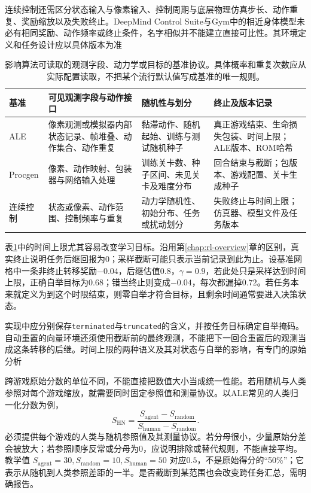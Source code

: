 连续控制还需区分状态输入与像素输入、控制周期与底层物理仿真步长、动作重复、奖励缩放以及失败终止。DeepMind Control Suite与Gym中的相近身体模型未必有相同奖励、动作频率或终止条件，名字相似并不能建立直接可比性。其环境定义和任务设计应以具体版本为准

\begin{table}[t]
  \centering
  \small
  \begin{tabularx}{\linewidth}{>{\raggedright\arraybackslash}p{21mm} >{\raggedright\arraybackslash}X >{\raggedright\arraybackslash}X >{\raggedright\arraybackslash}X}
    \toprule
    基准 & 可见观测字段与动作接口 & 随机性与划分 & 终止及版本记录 \\
    \midrule
    ALE & 像素观测或模拟器内部状态记录、帧堆叠、动作集合、动作重复 & 黏滞动作、随机起始、训练与测试随机种子 & 真正游戏结束、生命损失包装、时间上限；ALE版本、ROM哈希 \\
    Procgen & 像素、动作映射、包装器与网络输入处理 & 训练关卡数、种子区间、未见关卡及难度分布 & 回合结束与截断；包版本、游戏配置、关卡生成种子 \\
    连续控制 & 状态或像素、动作范围、控制频率与重复 & 动力学随机性、初始分布、任务或扰动划分 & 失败终止与时间上限；仿真器、模型文件及任务版本 \\
    \bottomrule
  \end{tabularx}
  \caption{影响算法可读取的观测字段、动力学或目标的基准协议。具体概率和重复次数应从实际配置读取，不把某个流行默认值写成基准的唯一规则。}
  \label{tab:rl-learning-benchmark-settings}
\end{table}

表\ref{tab:rl-learning-benchmark-settings}中的时间上限尤其容易改变学习目标。沿用第\ref{chap:rl-overview}章的区别，真实终止说明任务后继回报为0；采样截断可能只表示当前记录到此为止。设基准网格中一条非终止转移奖励$-0.04$，后继估值$0.8$，$\gamma=0.9$，若此处只是采样达到时间上限，正确自举目标为$0.68$；错当终止则变成$-0.04$，每次都漏掉$0.72$。若任务本来就定义为到这个时限结束，则零自举才符合目标，且剩余时间通常要进入决策状态。

实现中应分别保存\texttt{terminated}与\texttt{truncated}的含义，并按任务目标确定自举掩码。自动重置的向量环境还须使用截断前的最终观测，不能把下一回合重置后的观测当成这条转移的后继。时间上限的两种语义及其对状态与自举的影响，有专门的原始分析

跨游戏原始分数的单位不同，不能直接把数值大小当成统一性能。若用随机与人类参照对每个游戏缩放，就需要同时固定参照值和测量协议。以ALE常见的人类归一化分数为例，
\[
  S_{\mathrm{HN}}
   =\frac{S_{\mathrm{agent}}-S_{\mathrm{random}}}
          {S_{\mathrm{human}}-S_{\mathrm{random}}}.
\]
必须提供每个游戏的人类与随机参照值及其测量协议。若分母很小，少量原始分差会被放大；若参照顺序反常或分母为0，应说明排除或替代规则，不能直接平均。教学值
$S_{\mathrm{agent}}=30,S_{\mathrm{random}}=10,S_{\mathrm{human}}=50$
对应$0.5$，不是原始得分的“50\%”；它表示从随机到人类参照差距的一半。是否截断到某范围也会改变跨任务汇总，需明确报告。

